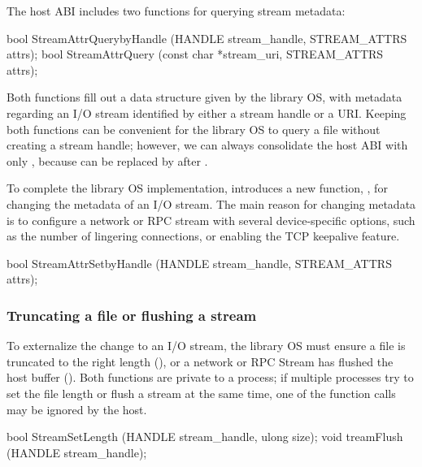 The host ABI includes two functions for querying stream metadata:

\begin{paldef}
bool StreamAttrQuerybyHandle (HANDLE stream_handle,
                              STREAM_ATTRS attrs);
bool StreamAttrQuery (const char *stream_uri,
                      STREAM_ATTRS attrs);

\end{paldef}

Both functions fill out a data structure given by the library OS,
with metadata regarding an I/O stream
identified by either a stream handle or a URI.
Keeping both functions can be convenient for the library OS to query a file without creating a stream handle;
however, we can always consolidate the host ABI
with only ,
because  can be replaced by 
after .


To complete the library OS implementation, \graphene{} introduces a new function,
,
for changing the metadata of an I/O stream.
The main reason for changing metadata
is to configure a network or RPC stream with several device-specific options,
such as the number of lingering connections,
or enabling the TCP keepalive feature.









\begin{paldef}
bool StreamAttrSetbyHandle (HANDLE stream_handle,
                            STREAM_ATTRS attrs);
\end{paldef}


\subsubsection*{Truncating a file or flushing a stream}




To externalize the change to an I/O stream, the library OS must ensure a file is truncated to the right length (), or a network or RPC Stream has flushed the host buffer ().
Both functions are private to a process; if multiple processes try
to set the file length or flush a stream at the same time, one of the function calls may be ignored by the host.


\begin{paldef}
bool StreamSetLength (HANDLE stream_handle, ulong size);
void treamFlush (HANDLE stream_handle);
\end{paldef}




